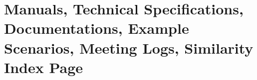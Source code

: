 \chapter{Manuals, Technical Specifications, Documentations, Example Scenarios, Meeting Logs, Similarity Index Page}
\vspace*{\fill}
